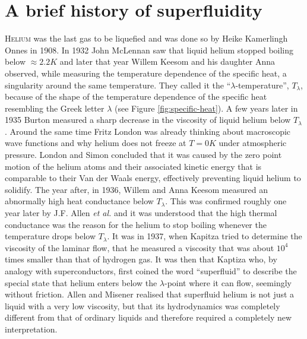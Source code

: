 	\section{A brief history of superfluidity}
		\lettrine[lines=3,findent=3pt,nindent=0pt]{H}{elium} was the last gas to be liquefied and was done so by Heike Kamerlingh Onnes in 1908\citep{Onnes1908,Onnes1909}. In 1932 John McLennan saw that liquid helium stopped boiling below $\approx\!2.2\unit{K}$\citep{McLennan1932} and later that year Willem Keesom and his daughter Anna observed, while measuring the temperature dependence of the specific heat, a singularity around the same temperature\citep{Keesom1932}. They called it the ``$\lambda$-temperature'',  $T_\lambda$, because of the shape of the temperature dependence of the specific heat resembling the Greek letter $\lambda$ (see Figure \ref{fig:specific-heat}). A few years later in 1935 Burton measured a sharp decrease in the viscosity of liquid helium below $T_\lambda$\citep{Burton1935}. Around the same time Fritz London was already thinking about macroscopic wave functions and why helium does not freeze at $T=0\unit{K}$ under atmospheric pressure\citep{London1935}. London and Simon concluded that it was caused by the zero point motion of the helium atoms and their associated kinetic energy that is comparable to their Van der Waals energy, effectively preventing liquid helium to solidify\citep{Simon1934,London1936}. The year after, in 1936, Willem and Anna Keesom measured an abnormally high heat conductance below $T_\lambda$\citep{Keesom1936}. This was confirmed roughly one year later by J.F. Allen \emph{et al.}\citep{Allen1937} and it was understood that the high thermal conductance was the reason for the helium to stop boiling whenever the temperature drops below $T_\lambda$. It was in 1937, when Kapitza tried to determine the viscosity of the laminar flow, that he measured a viscosity that was about $10^4$ times smaller than that of hydrogen gas\citep{Kapitza1938}. It was then that Kaptiza who, by analogy with superconductors, first coined the word ``superfluid''\citep{Kapitza1938} to describe the special state that helium enters below the $\lambda$-point where it can flow, seemingly without friction. Allen and Misener realised that superfluid helium is not just a liquid with a very low viscosity, but that its hydrodynamics was completely different from that of ordinary liquids\citep{Allen1938} and therefore required a completely new interpretation.\\
		
